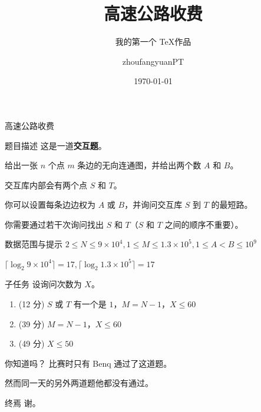 \documentclass{ctexbeamer}
\title{高速公路收费}
\subtitle{我的第一个 \TeX 作品}
\author{zhoufangyuanPT}
\date{\today}
\begin{document}
	\begin{frame}
		\titlepage
	\end{frame}

	\begin{frame}{高速公路收费}
		\begin{block}{题目描述}
			这是一道\textbf{交互题}。
			
			给出一张 $n$ 个点 $m$ 条边的无向连通图，并给出两个数 $A$ 和 $B$。
			
			交互库内部会有两个点 $S$ 和 $T$。
			
			你可以设置每条边边权为 $A$ 或 $B$，并询问交互库 $S$ 到 $T$ 的最短路。
			
			你需要通过若干次询问找出 $S$ 和 $T$（$S$ 和 $T$ 之间的顺序不重要）。
		\end{block}
		
		\begin{block}{数据范围与提示}
			$2\leq N\leq 9\times 10^4,1\leq M\leq 1.3\times 10^5,1\leq A<B\leq 10^9$

			$\lceil\log_2{9\times 10^4}\rceil=17,\lceil\log_2{1.3\times 10^5}\rceil=17$
		\end{block}

		\begin{block}{子任务}
			设询问次数为 $X$。

			\begin{enumerate}
				\item (12 分) $S$ 或 $T$ 有一个是 $1$，$M=N-1$，$X\leq 60$
				
				\item (39 分) $M=N-1$，$X\leq 60$
				
				\item (49 分) $X\leq 50$
			\end{enumerate}
		\end{block}
	\end{frame}

	\begin{frame}[t]{你知道吗？}
		比赛时只有 \textcolor[RGB]{30,132,73}{Benq} 通过了这道题。

		然而同一天的另外两道题他都没有通过。
	\end{frame}

	\begin{frame}{终焉}
		谢。
	\end{frame}
\end{document}
